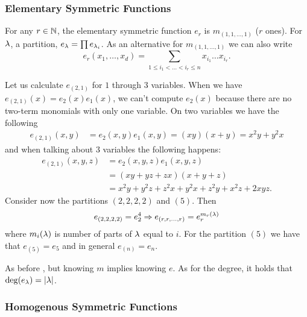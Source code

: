 \documentclass[12pt]{memoir}
\begin{document}
\subsubsection{Elementary Symmetric Functions}

\begin{Def}
For any $r\in\mathbb{N}$, the elementary symmetric function $e_r$ is $m_{(1,1,\dots,1)}$ ($r$ ones). For $\lambda$, a partition, $e_\lambda=\prod e_{\lambda_i}$. As an alternative for $m_{(1,1,\dots,1)}$ we can also write 
$$e_r(x_1,\dots,x_d)=\sum_{1\leq i_1<\dots<i_r\leq n}x_{i_1}\dots x_{i_r}.$$ 
\end{Def}

\begin{Ex}
    Let us calculate $e_{(2,1)}$ for $1$ through $3$ variables. When we have $e_{(2,1)}(x)=e_2(x)e_1(x)$, we can't compute $e_2(x)$ because there are no two-term monomials with only one variable. On two variables we have the following
    \begin{align*}
        e_{(2,1)}(x,y)&=e_2(x,y)e_1(x,y)=(xy)(x+y)=x^2y+y^2x
    \end{align*}
    and when talking about $3$ variables the following happens:
    \begin{align*}
        e_{(2,1)}(x,y,z)&=e_2(x,y,z)e_1(x,y,z)\\
        &=(xy+yz+zx)(x+y+z)\\
        &=x^2y+y^2z+z^2x+y^2x+z^2y+x^2z+2xyz.
    \end{align*}
    Consider now the partitions $(2,2,2,2)$ and $(5)$. Then 
    $$e_{(2,2,2,2)}=e_2^4\Rightarrow e_{(r,r,\dots,r)}=e_r^{m_r(\lambda)}$$
    where $m_i(\lambda)$ is number of parts of $\lambda$ equal to $i$. For the partition $(5)$ we have that $e_{(5)}=e_5$ and in general $e_{(n)}=e_n$.
\end{Ex}

\begin{Rmk}
    As before , but knowing $m$ implies knowing $e$. As for the degree, it holds that $\deg(e_\lambda)=|\lambda|$.
\end{Rmk}

\subsubsection{Homogenous Symmetric Functions}
\end{document}
